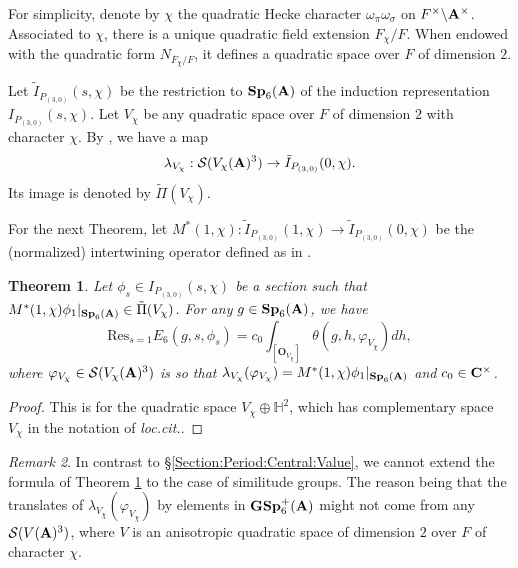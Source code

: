 \documentclass[11pt, reqno]{amsart}
\theoremstyle{plain}
\newtheorem{theorem}{Theorem}[section]
\theoremstyle{definition}
\theoremstyle{remark}
\newtheorem{remark}[theorem]{Remark}
\theoremstyle{plain}
\def\C{{\bf C}}
\def\A{{\bf A}}
\def\GSp{{\mathbf{GSp}}}
\def\Sp{{\mathbf{Sp}}}
\begin{document}
For simplicity, denote by $\chi$ the quadratic Hecke character $ \omega_\pi\omega_\sigma$ on $F^\times \backslash \A^\times$. Associated to $\chi$, there is a unique quadratic field extension
$F_{\chi}/F$. When endowed with the quadratic form  $N_{F_\chi/F}$, it  defines a quadratic space over $F$ of dimension $2$. 

Let $\tilde{I}_{P_{(3,0)}}(s,\chi)$ be the restriction to $\Sp_6(\A)$ of the induction representation $I_{P_{(3,0)}}(s,\chi)$. Let $V_\chi$ be any quadratic space over  $F$ of dimension $2$ with character $\chi$. By \cite{KudlaRallis}, we have a map 
\[\lambda_{V_\chi} :\mathcal{S}(V_\chi(\A)^3)\to  \tilde{I}_{P_{(3,0)}}(0,\chi).\] Its image is denoted by $\tilde{\Pi}(V_\chi)$.

For the next Theorem, let $M^*(1,\chi): \tilde{I}_{P_{(3,0)}}(1,\chi)\to \tilde{I}_{P_{(3,0)}}(0,\chi)$ be the (normalized) intertwining operator defined as in \cite[p. 4]{KudlaRallis}.
\begin{theorem}\label{Siegel-Weil}
     Let $\phi_s\in I_{P_{(3,0)}}\left(s,\chi\right)$ be a section such that $M^*(1,\chi){\phi_1}|_{\Sp_6(\A)}\in\tilde{\Pi}(V_\chi)$. For any $g\in\Sp_6(\A)$, we have
     \[\mathrm{Res}_{s = 1}E_{6}\left(g,s,\phi_s\right) = c_0\int_{[\mathbf{O}_{{V_\chi}}]}\theta(g,h,\varphi_{V_\chi})dh,\]
     where $\varphi_{V_\chi}\in \mathcal{S}(V_\chi(\A)^3)$ is so that $\lambda_{V_\chi}(\varphi_{V_\chi}) = M^*(1,\chi){\phi_1}|_{\Sp_6(\A)}$ and $c_0\in \C^{\times}$.
\end{theorem}
\begin{proof}
    This is \cite[Corollary 6.3]{KudlaRallis} for the quadratic space  $V_\chi \oplus \mathbb{H}^2$, which has complementary space $V_\chi$ in the notation of \textit{loc.cit.}.
\end{proof}

\begin{remark}
    In contrast to \S\ref{Section:Period:Central:Value}, we cannot extend the formula of Theorem \ref{Siegel-Weil} to the case of similitude groups. The reason being that the translates of $\lambda_{V_\chi}(\varphi_{V_\chi})$ by elements in $\GSp_6^+(\A)$ might not come from any $\mathcal{S}(V(\A)^3)$, where $V$ is an anisotropic quadratic space of dimension $2$ over $F$ of character $\chi$. 
\end{remark}
\end{document}
